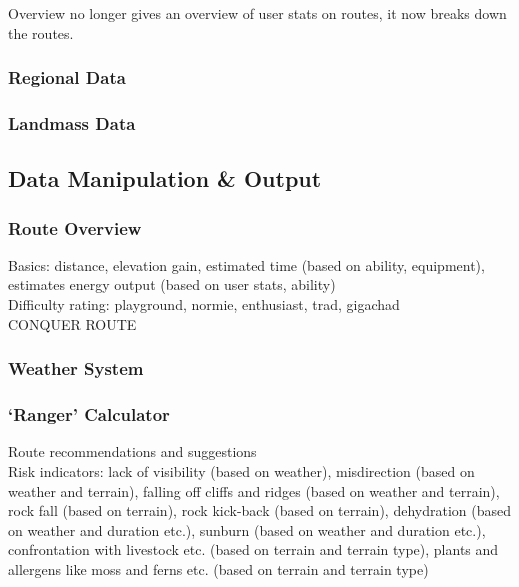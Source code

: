 \documentclass[11pt, english]{article}
\begin{document}
		Overview no longer gives an overview of user stats on routes, it now breaks down the routes.

		\subsubsection{Regional Data}

		\subsubsection{Landmass Data}

	\subsection{Data Manipulation \& Output}

		\subsubsection{Route Overview}	
	
		Basics: distance, elevation gain, estimated time (based on ability, equipment), estimates energy output (based on user stats, ability)\\

		Difficulty rating: playground, normie, enthusiast, trad, gigachad\\

		CONQUER ROUTE

		\subsubsection{Weather System}

		\subsubsection{`Ranger' Calculator}

		Route recommendations and suggestions\\
		
		Risk indicators: lack of visibility (based on weather), misdirection (based on weather and terrain), falling off cliffs and ridges (based on weather and terrain), rock fall (based on terrain), rock kick-back (based on terrain), dehydration (based on weather and duration etc.), sunburn (based on weather and duration etc.), confrontation with livestock etc. (based on terrain and terrain type), plants and allergens like moss and ferns etc. (based on terrain and terrain type)\\
\end{document}
